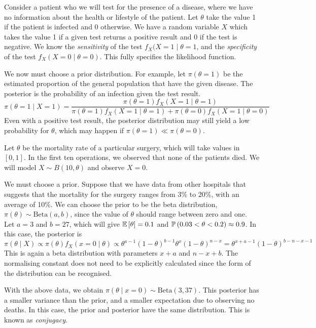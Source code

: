 \begin{example}
	Consider a patient who we will test for the presence of a disease, where we have no information about the health or lifestyle of the patient.
	Let \( \theta \) take the value 1 if the patient is infected and 0 otherwise.
	We have a random variable \( X \) which takes the value 1 if a given test returns a positive result and 0 if the test is negative.
	We know the \textit{sensitivity} of the test \( f_X(X=1\mid \theta=1 \), and the \textit{specificity} of the test \( f_X(X=0\mid \theta=0) \).
	This fully specifies the likelihood function.

	We now must choose a prior distribution.
	For example, let \( \pi(\theta = 1) \) be the estimated proportion of the general population that have the given disease.
	The posterior is the probability of an infection given the test result.
	\[ \pi(\theta = 1 \mid X = 1) = \frac{\pi(\theta = 1) f_X(X = 1 \mid \theta = 1)}{\pi(\theta = 1) f_X(X = 1 \mid \theta = 1) + \pi(\theta = 0) f_X(X = 1 \mid \theta = 0)} \]
	Even with a positive test result, the posterior distribution may still yield a low probability for \( \theta \), which may happen if \( \pi(\theta = 1) \ll \pi(\theta = 0) \).
\end{example}
\begin{example}
	Let \( \theta \) be the mortality rate of a particular surgery, which will take values in \( [0,1] \).
	In the first ten operations, we observed that none of the patients died.
	We will model \( X \sim B(10,\theta) \) and observe \( X = 0 \).

	We must choose a prior.
	Suppose that we have data from other hospitals that suggests that the mortality for the surgery ranges from 3\% to 20\%, with an average of 10\%.
	We can choose the prior to be the beta distribution, \( \pi(\theta) \sim \mathrm{Beta}(a,b) \), since the value of \( \theta \) should range between zero and one.
	Let \( a = 3 \) and \( b = 27 \), which will give \( \mathbb{E}\left[{\theta}\right] = 0.1 \) and \( \mathbb{P}\left({0.03 < \theta < 0.2}\right) \approx 0.9 \).
	In this case, the posterior is
	\[ \pi(\theta \mid X) \propto \pi(\theta) f_X(x = 0 \mid \theta) \propto \theta^{a-1} (1-\theta)^{b-1} \theta^x (1-\theta)^{n-x} = \theta^{x+a-1} (1-\theta)^{b-n-x-1} \]
	This is again a beta distribution with parameters \( x+a \) and \( n-x+b \).
	The normalising constant does not need to be explicitly calculated since the form of the distribution can be recognised.

	With the above data, we obtain \( \pi(\theta \mid x = 0) \sim \mathrm{Beta}(3,37) \).
	This posterior has a smaller variance than the prior, and a smaller expectation due to observing no deaths.
	In this case, the prior and posterior have the same distribution.
	This is known as \textit{conjugacy}.
\end{example}

